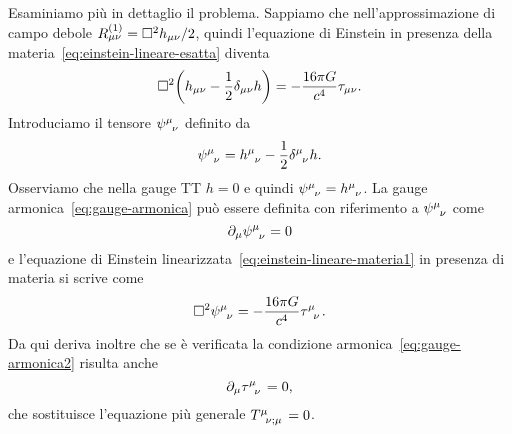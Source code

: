 Esaminiamo più in dettaglio il problema.  Sappiamo che nell'approssimazione di
campo debole $R_{\mu\nu}^{(1)} = \Box^{2} h_{\mu\nu}/2$, quindi l'equazione di
Einstein in presenza della materia~\eqref{eq:einstein-lineare-esatta} diventa
\begin{equation}
  \label{eq:einstein-lineare-materia1}
  \Box^{2} \bigg(h_{\mu\nu} - \frac{1}{2}\delta_{\mu\nu}h \bigg) = -\frac{16\pi
    G}{c^{4}} \tau_{\mu\nu}.
\end{equation}
Introduciamo il tensore $\tensor{\psi}{^{\mu}_{\nu}}$ definito da
\begin{equation}
  \tensor{\psi}{^{\mu}_{\nu}} = \tensor{h}{^{\mu}_{\nu}} - \frac{1}{2}
  \tensor{\delta}{^{\mu}_{\nu}} h.
\end{equation}
Osserviamo che nella gauge TT $h = 0$ e quindi
$\tensor{\psi}{^{\mu}_{\nu}} = \tensor{h}{^{\mu}_{\nu}}$.  La gauge
armonica~\eqref{eq:gauge-armonica} può essere definita con riferimento a
$\tensor{\psi}{^{\mu}_{\nu}}$ come
\begin{equation}
  \label{eq:gauge-armonica2}
  \partial_{\mu}\tensor{\psi}{^{\mu}_{\nu}} = 0
\end{equation}
e l'equazione di Einstein linearizzata~\eqref{eq:einstein-lineare-materia1} in
presenza di materia si scrive come
\begin{equation}
  \label{eq:einstein-lineare-materia2}
  \dalamb \tensor{\psi}{^{\mu}_{\nu}} = -\frac{16\pi G}{c^{4}}
  \tensor{\tau}{^{\mu}_{\nu}}.
\end{equation}
Da qui deriva inoltre che se è verificata la condizione
armonica~\eqref{eq:gauge-armonica2} risulta anche
\begin{equation}
  \label{eq:gauge-armonica-tau}
  \partial_{\mu}\tensor{\tau}{^{\mu}_{\nu}} = 0,
\end{equation}
che sostituisce l'equazione più generale $\tensor{T}{^{\mu}_{\nu;\mu}} = 0$.


